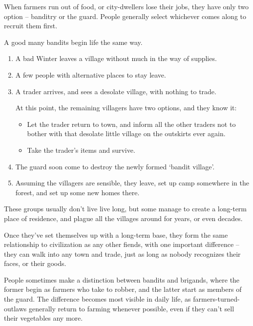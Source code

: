 \begin{multicols}{2}

When farmers run out of food, or city-dwellers lose their jobs, they have only two option -- banditry or the \gls{guard}.
People generally select whichever comes along to recruit them first.

A good many bandits begin life the same way.

\begin{enumerate}
  \item
  A bad Winter leaves a village without much in the way of supplies.
  \item
  A few people with alternative places to stay leave.
  \item
  A trader arrives, and sees a desolate village, with nothing to trade.

  At this point, the remaining villagers have two options, and they know it:
  \begin{itemize}
    \item
    Let the trader return to town, and inform all the other traders not to bother with that desolate little village on the outskirts ever again.
    \item
    Take the trader's items and survive.
  \end{itemize}
  \item
  The \gls{guard} soon come to destroy the newly formed `bandit village'.
  \item
  Assuming the villagers are sensible, they leave, set up camp somewhere in the forest, and set up some new homes there.
\end{enumerate}

\noindent
These groups usually don't live live long, but some manage to create a long-term place of residence, and plague all the villages around for years, or even decades.

Once they've set themselves up with a long-term base, they form the same relationship to civilization as any other fiends, with one important difference -- they can walk into any town and trade, just as long as nobody recognizes their faces, or their goods.

People sometimes make a distinction between bandits and brigands, where the former begin as farmers who take to robber, and the latter start as members of the \gls{guard}.
The difference becomes most visible in daily life, as farmers-turned-outlaws generally return to farming whenever possible, even if they can't sell their vegetables any more.


\end{multicols}
